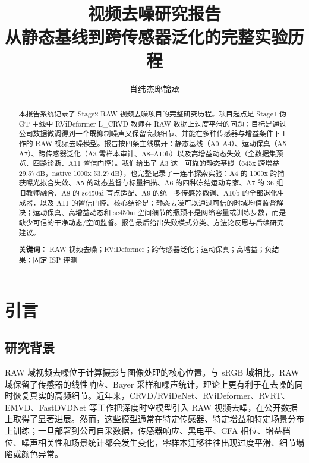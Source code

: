 \documentclass[11pt,a4paper,UTF8,fontset=fandol]{ctexart}
\title{\textbf{视频去噪研究报告}\\[0.4em]
\large 从静态基线到跨传感器泛化的完整实验历程}
\author{肖纬杰\quad 邸锦承}
\date{}
\newcommand{\db}{\ensuremath{\,\mathrm{dB}}}
\begin{document}
\maketitle

\begin{abstract}
\noindent
本报告系统记录了 Stage2 RAW 视频去噪项目的完整研究历程。项目起点是 Stage1 伪 GT 主线中 RViDeformer-L\_CRVD 教师在 RAW 数据上过度平滑的问题；目标是通过公司数据微调得到一个既抑制噪声又保留高频细节、并能在多种传感器与增益条件下工作的 RAW 视频去噪模型。报告按四条主线展开：静态基线（A0--A4）、运动保真（A5--A7）、跨传感器泛化（A3 零样本审计、A8--A10b）以及高增益动态失效（全数据集预览、四路诊断、A11 置信门控）。我们给出了 A3 这一可靠的静态基线（645x 跨增益 29.57\db，native 1000x 53.27\db），也完整记录了一连串探索实验：A4 的 1000x 跨捕获曝光拟合失效、A5 的动态监督与标量扫描、A6 的四种冻结运动专家、A7 的 36 组旧教师融合、A8 的 sc450ai 盲点适配、A9 的统一多传感器微调、A10b 的全部退化生成器，以及 A11 的置信门控。核心结论是：静态去噪可以通过可信的时域均值监督解决；运动保真、高增益动态和 sc450ai 空间细节的瓶颈不是网络容量或训练步数，而是缺少可信的干净动态/空间监督。报告最后给出失败模式分类、方法论反思与后续研究建议。

\vspace{0.8em}
\noindent\textbf{关键词：} RAW 视频去噪；RViDeformer；跨传感器泛化；运动保真；高增益；负结果；固定 ISP 评测
\end{abstract}

\newpage
\tableofcontents
\newpage

\section{引言}

\subsection{研究背景}

RAW 域视频去噪位于计算摄影与图像处理的核心位置。与 sRGB 域相比，RAW 域保留了传感器的线性响应、Bayer 采样和噪声统计，理论上更有利于在去噪的同时恢复真实的高频细节\cite{r1,r2,r8}。近年来，CRVD/RViDeNet\cite{r1}、RViDeformer\cite{r2}、RVRT\cite{r3}、EMVD\cite{r15}、FastDVDNet\cite{r16} 等工作把深度时空模型引入 RAW 视频去噪，在公开数据上取得了显著进展。然而，这些模型通常在特定传感器、特定增益和特定场景分布上训练；一旦部署到公司自采数据，传感器响应、黑电平、CFA 相位、增益档位、噪声相关性和场景统计都会发生变化，零样本迁移往往出现过度平滑、细节塌陷或颜色异常。
\end{document}
